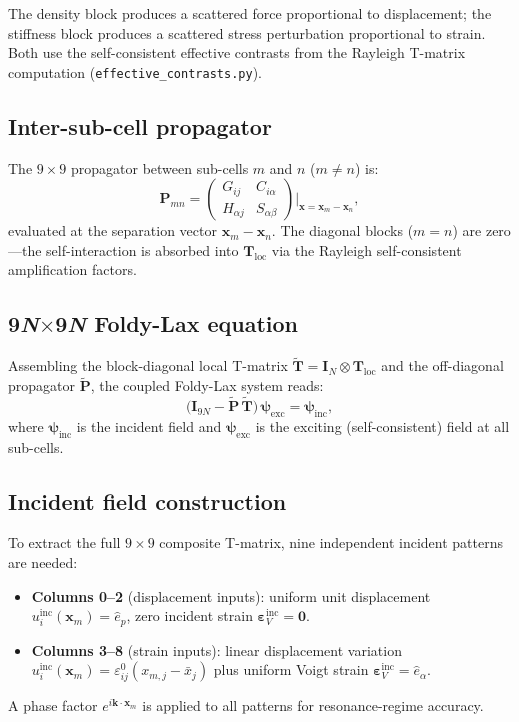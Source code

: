 \documentclass[11pt,a4paper]{article}
\newcommand{\bI}{\mathbf{I}}
\newcommand{\bx}{\mathbf{x}}
\newcommand{\bT}{\mathbf{T}}
\newcommand{\bP}{\mathbf{P}}
\newcommand{\bpsi}{\boldsymbol{\psi}}
\newcommand{\beps}{\boldsymbol{\varepsilon}}
\begin{document}
The density block produces a scattered force proportional to
displacement; the stiffness block produces a scattered stress
perturbation proportional to strain.  Both use the self-consistent
effective contrasts from the Rayleigh T-matrix computation
(\texttt{effective\_contrasts.py}).

\subsection{Inter-sub-cell propagator}

The $9 \times 9$ propagator between sub-cells $m$ and $n$ ($m \neq n$)
is:
\begin{equation}
  \boxed{
  \bP_{mn}
  = \begin{pmatrix}
      G_{ij} & C_{i\alpha} \\[4pt]
      H_{\alpha j} & S_{\alpha\beta}
    \end{pmatrix}
  \bigg|_{\bx = \bx_m - \bx_n},
  }
  \label{eq:Pmn}
\end{equation}
evaluated at the separation vector $\bx_m - \bx_n$.
The diagonal blocks ($m = n$) are zero---the self-interaction is
absorbed into $\bT_\text{loc}$ via the Rayleigh self-consistent
amplification factors.

\subsection{9\textit{N}\texorpdfstring{$\times$}{x}9\textit{N}
  Foldy-Lax equation}

Assembling the block-diagonal local T-matrix $\tilde{\bT}
= \bI_N \otimes \bT_\text{loc}$ and the off-diagonal propagator
$\tilde{\bP}$, the coupled Foldy-Lax system reads:
\begin{equation}
  \boxed{
  \bigl(\bI_{9N} - \tilde{\bP}\,\tilde{\bT}\bigr)\,
    \bpsi_\text{exc} = \bpsi_\text{inc},
  }
  \label{eq:FoldyLax}
\end{equation}
where $\bpsi_\text{inc}$ is the incident field and
$\bpsi_\text{exc}$ is the exciting (self-consistent) field at all
sub-cells.

\subsection{Incident field construction}

To extract the full $9 \times 9$ composite T-matrix, nine
independent incident patterns are needed:
\begin{itemize}
  \item \textbf{Columns 0--2} (displacement inputs): uniform unit
    displacement $u_i^\text{inc}(\bx_m) = \hat{e}_p$, zero incident
    strain $\beps_V^\text{inc} = \mathbf{0}$.
  \item \textbf{Columns 3--8} (strain inputs): linear displacement
    variation $u_i^\text{inc}(\bx_m) = \varepsilon^0_{ij}
    (x_{m,j} - \bar{x}_j)$ plus uniform Voigt strain
    $\beps_V^\text{inc} = \hat{e}_\alpha$.
\end{itemize}
A phase factor $e^{i\mathbf{k} \cdot \bx_m}$ is applied to all
patterns for resonance-regime accuracy.
\end{document}
